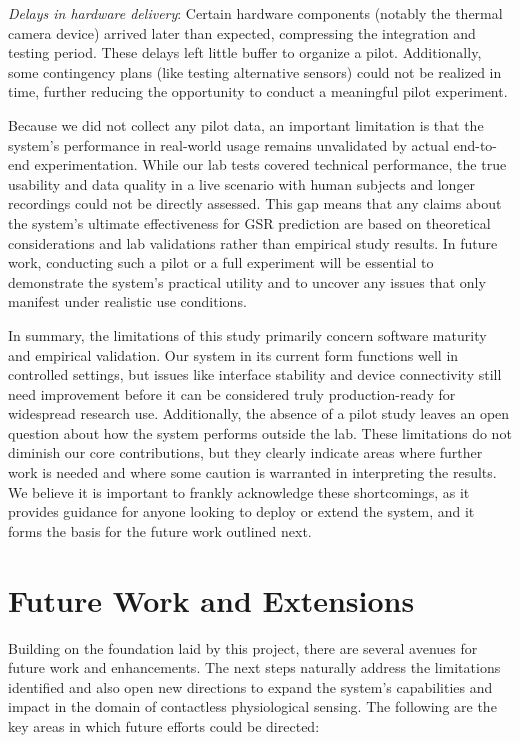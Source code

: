\textit{Delays in hardware delivery}: Certain hardware components (notably the thermal camera device) arrived later than expected, compressing the integration and testing period. These delays left little buffer to organize a pilot. Additionally, some contingency plans (like testing alternative sensors) could not be realized in time, further reducing the opportunity to conduct a meaningful pilot experiment.

Because we did not collect any pilot data, an important limitation is that the system's performance in real-world usage remains unvalidated by actual end-to-end experimentation. While our lab tests covered technical performance, the true usability and data quality in a live scenario with human subjects and longer recordings could not be directly assessed. This gap means that any claims about the system's ultimate effectiveness for GSR prediction are based on theoretical considerations and lab validations rather than empirical study results. In future work, conducting such a pilot or a full experiment will be essential to demonstrate the system's practical utility and to uncover any issues that only manifest under realistic use conditions.

In summary, the limitations of this study primarily concern software maturity and empirical validation. Our system in its current form functions well in controlled settings, but issues like interface stability and device connectivity still need improvement before it can be considered truly production-ready for widespread research use. Additionally, the absence of a pilot study leaves an open question about how the system performs outside the lab. These limitations do not diminish our core contributions, but they clearly indicate areas where further work is needed and where some caution is warranted in interpreting the results. We believe it is important to frankly acknowledge these shortcomings, as it provides guidance for anyone looking to deploy or extend the system, and it forms the basis for the future work outlined next.

\section{Future Work and Extensions}

Building on the foundation laid by this project, there are several avenues for future work and enhancements. The next steps naturally address the limitations identified and also open new directions to expand the system's capabilities and impact in the domain of contactless physiological sensing. The following are the key areas in which future efforts could be directed:

